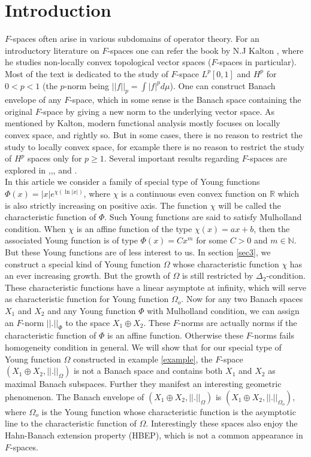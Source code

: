 \documentclass[pdflatex,sn-mathphys-num]{sn-jnl}%
\theoremstyle{thmstyleone}%
\theoremstyle{thmstyletwo}%
\theoremstyle{thmstylethree}%
\begin{document}
\section{Introduction}\label{sec1}
$F$-spaces often arise in various subdomains of operator theory. For an introductory literature on $F$-spaces one can refer the book   by N.J Kalton \cite{Kalton}, where he studies non-locally convex topological vector spaces ($F$-spaces in particular). Most of the text is dedicated to the study of $F$-space $L^p[0,1]$ and $H^p$ for $0<p<1$ (the $p$-norm being $||f||_p=\int|f|^pd\mu$). One can construct Banach envelope of any $F$-space, which in some sense is the  Banach space containing the original $F$-space by giving a new norm to the underlying vector space. As mentioned by Kalton, modern functional analysis mostly focuses on locally convex space, and rightly so. But in some cases, there is no reason to restrict the study to locally convex space, for example there is no reason to restrict the study of $H^p$ spaces only for $p\geq 1$. Several important results regarding $F$-spaces are explored in \cite{Cui},\cite{Drewnowski},\cite{Kalton1},\cite{Mastylo} and \cite{Kalton}.\\

 In this article we consider a family of special type of Young functions $\Phi(x)=|x|e^{\chi(\ln |x|)}$, where $\chi$ is a continuous even convex function on $\mathbb R$ which is also strictly increasing on positive axis. The function $\chi$ will be called the characteristic function of $\Phi$. Such Young functions are said to satisfy Mulholland condition. When $\chi$ is an affine function of the type $\chi(x)=ax+b$, then the associated Young function is of type $\Phi(x)=Cx^m$ for some $C>0$ and $m\in \mathbb N$. But these Young functions are of less interest to us. In section \ref{sec3}, we construct a special kind of Young function $\Omega$ whose characteristic function $\chi$ has an ever increasing growth. But the growth of $\Omega$ is still restricted by $\Delta_2$-condition. These characteristic functions have a linear asymptote at infinity, which will serve as characteristic function for Young function $\Omega_o$. Now for any two Banach spaces $X_1$ and $X_2$ and any Young function $\Phi$ with Mulholland condition, we can assign an $F$-norm $||.||_{\Phi}$ to the space $X_1\oplus X_2$. These $F$-norms are actually norms if the characteristic function of $\Phi$ is an affine function. Otherwise these $F$-norms fails homogeneity condition in general. We will show that for our special type of Young function $\Omega$ constructed in example \ref{example}, the $F$-space $(X_1\oplus X_2,||.||_\Omega)$ is not a Banach space and contains both $X_1$ and $X_2$ as maximal Banach subspaces. Further they manifest an interesting geometric phenomenon. The Banach envelope of $(X_1\oplus X_2,||.||_\Omega)$ is $(X_1\oplus X_2,||.||_{\Omega_o})$, where $\Omega_o$ is the Young function whose characteristic function is the asymptotic line to the characteristic function of $\Omega$. Interestingly these spaces also enjoy the Hahn-Banach extension property (HBEP), which is not a common appearance in $F$-spaces. 
\end{document}
